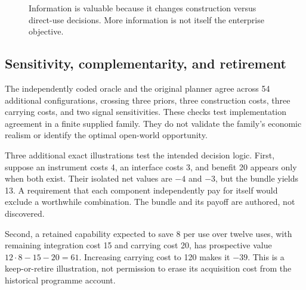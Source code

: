 \documentclass[11pt,letterpaper]{article}
\theoremstyle{remark}\newtheorem{remark}{Remark}[section]
\begin{document}
\begin{figure}[H]
\centering
{}
\caption{Information is valuable because it changes construction versus direct-use decisions. More information is not itself the enterprise objective.}
\end{figure}

\subsection{Sensitivity, complementarity, and retirement}
The independently coded oracle and the original planner agree across 54 additional configurations, crossing three priors, three construction costs, three carrying costs, and two signal sensitivities. These checks test implementation agreement in a finite supplied family. They do not validate the family's economic realism or identify the optimal open-world opportunity.

Three additional exact illustrations test the intended decision logic. First, suppose an instrument costs 4, an interface costs 3, and benefit 20 appears only when both exist. Their isolated net values are $-4$ and $-3$, but the bundle yields 13. A requirement that each component independently pay for itself would exclude a worthwhile combination. The bundle and its payoff are authored, not discovered.

Second, a retained capability expected to save 8 per use over twelve uses, with remaining integration cost 15 and carrying cost 20, has prospective value $12\cdot8-15-20=61$. Increasing carrying cost to 120 makes it $-39$. This is a keep-or-retire illustration, not permission to erase its acquisition cost from the historical programme account.
\end{document}
